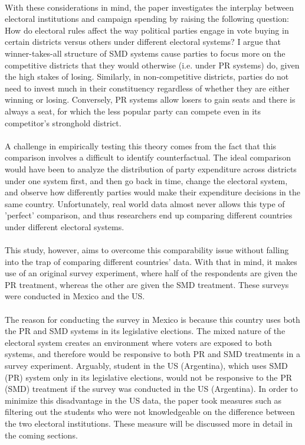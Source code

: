 \documentclass{article}
\begin{document}
\\
With these considerations in mind, the paper investigates the interplay between electoral institutions and campaign spending by raising the following question: How do electoral rules affect the way political parties engage in vote buying in certain districts versus others under different electoral systems? I argue that winner-takes-all structure of SMD systems cause parties to focus more on the competitive districts that they would otherwise (i.e. under PR systems) do, given the high stakes of losing. Similarly, in non-competitive districts, parties do not need to invest much in their constituency regardless of whether they are either winning or losing. Conversely, PR systems allow losers to gain seats and there is always a seat, for which the less popular party can compete even in its competitor's stronghold district.\\
\\
A challenge in empirically testing this theory comes from the fact that this comparison involves a difficult to identify counterfactual. The ideal comparison would have been to analyze the distribution of party expenditure across districts under one system first, and then go back in time, change the electoral system, and observe how differently parties would make their expenditure decisions in the same country. Unfortunately, real world data almost never allows this type of 'perfect' comparison, and thus researchers end up comparing different countries under different electoral systems. \\
\\
This study, however, aims to overcome this comparability issue without falling into the trap of comparing different countries' data. With that in mind, it makes use of an original survey experiment, where half of the respondents are given the PR treatment, whereas the other are given the SMD treatment. These surveys were conducted in Mexico and the US. \\
\\
The reason for conducting the survey in Mexico is because this country uses both the PR and SMD systems in its legislative elections. The mixed nature of the electoral system creates an environment where voters are exposed to both systems, and therefore would be responsive to both PR and SMD treatments in a survey experiment. Arguably, student in the US (Argentina), which uses SMD (PR) system only in its legislative elections, would not be responsive to the PR (SMD) treatment if the survey was conducted in the US (Argentina). In order to minimize this disadvantage in the US data, the paper took measures such as filtering out the students who were not knowledgeable on the difference between the two electoral institutions. These measure will be discussed more in detail in the coming sections.
\end{document}
